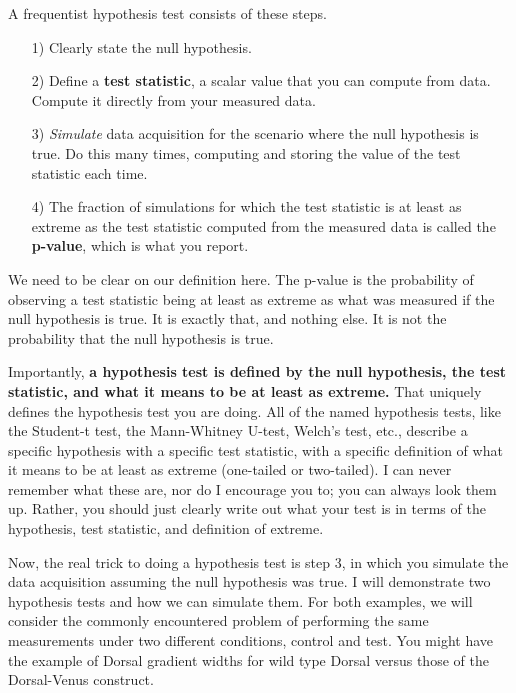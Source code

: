 A frequentist hypothesis test consists of these steps.
\begin{enumerate}
    \item[1)] Clearly state the null hypothesis.
    \item[2)] Define a \textbf{test statistic}, a scalar value that you can compute from data. Compute it directly from your measured data.
    \item[3)] \textit{Simulate} data acquisition for the scenario where the null hypothesis is true. Do this many times, computing and storing the value of the test statistic each time.
    \item[4)] The fraction of simulations for which the test statistic is at least as extreme as the test statistic computed from the measured data is called the \textbf{p-value}, which is what you report.
\end{enumerate}
We need to be clear on our definition here. The p-value is the probability of observing a test statistic being at least as extreme as what was measured if the null hypothesis is true. It is exactly that, and nothing else. It is not the probability that the null hypothesis is true.

Importantly, \textbf{a hypothesis test is defined by the null hypothesis, the test statistic, and what it means to be at least as extreme.} That uniquely defines the hypothesis test you are doing. All of the named hypothesis tests, like the Student-t test, the Mann-Whitney U-test, Welch's test, etc., describe a specific hypothesis with a specific test statistic, with a specific definition of what it means to be at least as extreme (one-tailed or two-tailed). I can never remember what these are, nor do I encourage you to; you can always look them up. Rather, you should just clearly write out what your test is in terms of the hypothesis, test statistic, and definition of extreme.

Now, the real trick to doing a hypothesis test is step 3, in which you simulate the data acquisition assuming the null hypothesis was true. I will demonstrate two hypothesis tests and how we can simulate them. For both examples, we will consider the commonly encountered problem of performing the same measurements under two different conditions, control and test. You might have the example of Dorsal gradient widths for wild type Dorsal versus those of the Dorsal-Venus construct.

